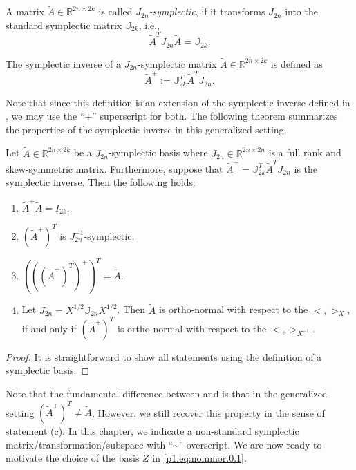 \begin{definition}
A matrix $\tilde A\in \mathbb R^{2n\times 2k}$ is called \emph{$J_{2n}$-symplectic}, if it transforms $J_{2n}$ into the standard symplectic matrix $\mathbb J_{2k}$, i.e.,
\begin{equation} \label{p1.eq:nommor.0.3}
	\tilde A^T J_{2n} \tilde A = \mathbb J_{2k}.
\end{equation}
\end{definition}

\begin{definition}
The symplectic inverse of a $J_{2n}$-symplectic matrix $\tilde A\in \mathbb R^{2n\times 2k}$ is defined as
\begin{equation} \label{p1.eq:nommor.0.4}
	\tilde A^{+} := \mathbb J_{2k}^T \tilde A^T J_{2n}.
\end{equation}
\end{definition}
Note that since this definition is an extension of the symplectic inverse defined in , we may use the ``$+$'' superscript for both. The following theorem summarizes the properties of the symplectic inverse in this generalized setting.

\begin{proposition} \label{thm:2}
Let $\tilde A\in \mathbb R^{2n\times 2k}$ be a $J_{2n}$-symplectic basis where $J_{2n}\in\mathbb R^{2n\times 2n}$ is a full rank and skew-symmetric matrix. Furthermore, suppose that $\tilde A^{+} = \mathbb{J}_{2k}^T \tilde A^T J_{2n}$ is the symplectic inverse. Then the following holds:
\begin{enumerate} [label=(\alph*)]
\item $\tilde A^+ \tilde A = I_{2k}$.
\item $(\tilde A^+)^T$ is $J_{2n}^{-1}$-symplectic.
\item $\left(\left(\left(\tilde A^+\right)^T\right)^+\right)^T = \tilde A$.
\item Let $J_{2n}=X^{1/2}\mathbb J_{2n} X^{1/2}$. Then $\tilde A$ is ortho-normal with respect to the $<,>_X$, if and only if $(\tilde A^+)^T$ is ortho-normal with respect to the $<,>_{X^{-1}}$.
\end{enumerate}
\end{proposition}
\begin{proof}
It is straightforward to show all statements using the definition of a symplectic basis.
\end{proof}

Note that the fundamental difference between  and  is that in the generalized setting $(\tilde A^+)^T \neq \tilde A$. However, we still recover this property in the sense of statement (c). In this chapter, we indicate a non-standard symplectic matrix/transformation/subspace with ``\textasciitilde'' overscript. We are now ready to motivate the choice of the basis $\tilde Z$ in \eqref{p1.eq:nommor.0.1}.

